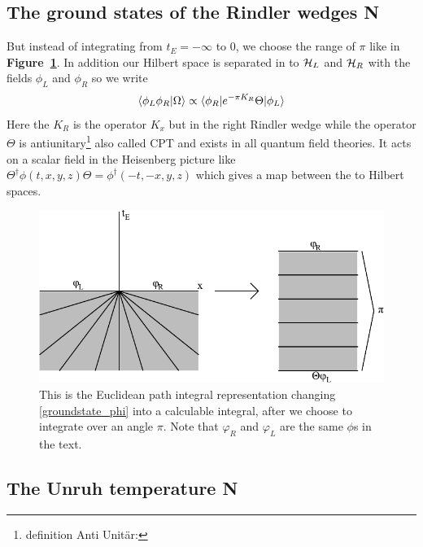 	\subsection{The ground states of the Rindler wedges N}
	But instead of integrating from $t_E= -\infty$ to 0, we choose the range of $\pi$ like in \textbf{Figure~\ref{eucpath}}. In addition our Hilbert space is separated in to $\mathcal{H}_L$ and $\mathcal{H}_R$ with the fields $\phi_L$ and $\phi_R$ so we write 
	\begin{align}
		\braket{\phi_L \phi_R | \Omega} \propto \braket{\phi_R| e^{-\pi K_R} \Theta| \phi_L}
	\end{align}
	Here the $K_R$ is the operator $K_x$ but in the right Rindler wedge while the operator $\Theta$ is antiunitary\footnote{definition Anti Unitär:} also called CPT and exists in all quantum field theories. It acts on a scalar field in the Heisenberg picture like $\Theta^\dagger \phi(t,x,y,z)\Theta = \phi^\dagger(-t,-x,y,z)$ which gives a map between the to Hilbert spaces.
	\begin{figure}[tbp]
		\begin{center}
			\includegraphics[scale=1]{eucpath}
			\caption{This is the Euclidean path integral representation changing \eqref{groundstate_phi} into a calculable integral, after we choose to integrate over an angle $\pi$. Note that $\varphi_R$ and $\varphi_L$ are the same $\phi$s in the text.}\label{eucpath}
		\end{center}
	\end{figure}
	\subsection{The Unruh temperature N}
	
